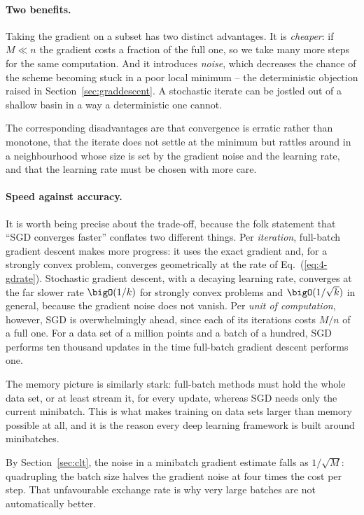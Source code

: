 \paragraph{Two benefits.}
Taking the gradient on a subset has two distinct advantages.  It is
\emph{cheaper}: if $M\ll n$ the gradient costs a fraction of the full one, so
we take many more steps for the same computation.  And it introduces
\emph{noise}, which decreases the chance of the scheme becoming stuck in a
poor local minimum -- the deterministic objection raised in
Section~\ref{sec:graddescent}.  A stochastic iterate can be jostled out of a
shallow basin in a way a deterministic one cannot.

The corresponding disadvantages are that convergence is erratic rather than
monotone, that the iterate does not settle at the minimum but rattles around
in a neighbourhood whose size is set by the gradient noise and the learning
rate, and that the learning rate must be chosen with more care.

\paragraph{Speed against accuracy.}
It is worth being precise about the trade-off, because the folk statement that
``SGD converges faster'' conflates two different things.  Per \emph{iteration},
full-batch gradient descent makes more progress: it uses the exact gradient
and, for a strongly convex problem, converges geometrically at the rate of
Eq.~(\ref{eq:4-gdrate}).  Stochastic gradient descent, with a decaying
learning rate, converges at the far slower rate $\bigO(1/k)$ for strongly
convex problems and $\bigO(1/\sqrt{k})$ in general, because the gradient noise
does not vanish.  Per \emph{unit of computation}, however, SGD is
overwhelmingly ahead, since each of its iterations costs $M/n$ of a full one.
For a data set of a million points and a batch of a hundred, SGD performs ten
thousand updates in the time full-batch gradient descent performs one.

The memory picture is similarly stark: full-batch methods must hold the whole
data set, or at least stream it, for every update, whereas SGD needs only the
current minibatch.  This is what makes training on data sets larger than
memory possible at all, and it is the reason every deep learning framework is
built around minibatches.

By Section~\ref{sec:clt}, the noise in a minibatch gradient estimate falls as
$1/\sqrt{M}$: quadrupling the batch size halves the gradient noise at four
times the cost per step.  That unfavourable exchange rate is why very large
batches are not automatically better.

